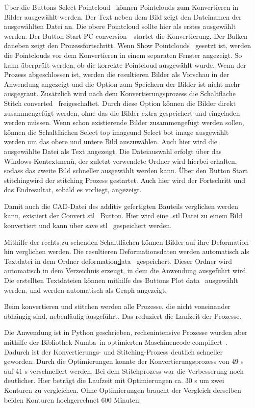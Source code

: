 Über die Buttons \glqq Select Pointcloud\grqq~ können Pointclouds zum Konvertieren in Bilder
ausgewählt werden. Der Text neben dem Bild zeigt den Dateinamen der ausgewählten 
Datei an. Die obere Pointcloud sollte hier als erstes ausgewählt werden.
Der Button \glqq Start PC conversion\grqq~~startet die Konvertierung. Der Balken 
daneben zeigt den Prozessfortschritt. 
Wenn \glqq Show Pointclouds\grqq~ gesetzt ist, werden die Pointclouds vor dem 
Konvertieren in einem separaten Fenster angezeigt. So kann überprüft werden, ob die 
korrekte Pointcloud ausgewählt wurde.
Wenn der Prozess abgeschlossen ist, werden die resultieren Bilder als Vorschau in der 
Anwendung angezeigt und die Option zum Speichern der Bilder ist nicht mehr ausgegraut.
Zusätzlich wird nach dem Konvertierungsprozess die Schaltfläche 
\glqq Stitch converted\grqq~ freigeschaltet. Durch diese Option können die 
Bilder direkt zusammengefügt werden, ohne das die Bilder extra gespeichert und 
eingeladen werden müssen. Wenn schon existierende Bilder zusammengefügt werden sollen, 
können die Schaltflächen \glqq Select top image\grqq und \glqq Select bot image\grqq
ausgewählt werden um das obere und untere Bild auszuwählen. Auch hier wird die 
ausgewählte Datei als Text angezeigt. Die Dateiauswahl erfolgt über das 
Windows-Kontextmenü, der zuletzt verwendete Ordner wird hierbei erhalten, sodass das 
zweite Bild schneller ausgewählt werden kann. 
Über den Button \glqq Start stitching\grqq wird der stitching Prozess gestartet. 
Auch hier wird der Fortschritt und das Endresultat, sobald es vorliegt, angezeigt.

Damit auch die CAD-Datei des additiv gefertigten Bauteils verglichen werden kann, 
existiert der \glqq Convert stl\grqq~ Button. Hier wird eine .stl Datei zu einem Bild 
konvertiert und kann über \glqq save stl\grqq~ gespeichert werden.

Mithilfe der rechts zu sehenden Schaltflächen können Bilder auf ihre Deformation hin 
verglichen werden. Die resultieren Deformationsdaten werden automatisch als Textdatei
in dem Ordner \glqq deformation\underline data\grqq~ gespeichert. Dieser Ordner wird automatisch 
in dem Verzeichnis erzeugt, in dem die Anwendung ausgeführt wird. 
Die erstellten Textdateien können mithilfe des Buttons \glqq Plot data\grqq~ ausgewählt 
werden, und werden automatisch als Graph angezeigt. 

Beim konvertieren und stitchen werden alle Prozesse, die nicht voneinander abhängig sind,  
nebenläufig ausgeführt. Das reduziert die Laufzeit der Prozesse.

Die Anwendung ist in Python geschrieben, rechenintensive Prozesse wurden aber mithilfe 
der Bibliothek \glqq Numba\grqq~in optimierten Maschinencode compiliert~\cite{numba}.
Dadurch ist der Konvertierungs- und Stitching-Prozess deutlich schneller geworden. 
Durch die Optimierungen konnte der Konvertierungsprozess von 49 s auf 41 s verschnellert 
werden. Bei dem Stitchprozess war die Verbesserung noch deutlicher. Hier 
beträgt die Laufzeit mit Optimierungen ca. 30 s um zwei Konturen zu vergleichen. 
Ohne Optimierungen braucht der Vergleich derselben beiden Konturen 
hochgerechnet 600 Minuten.



